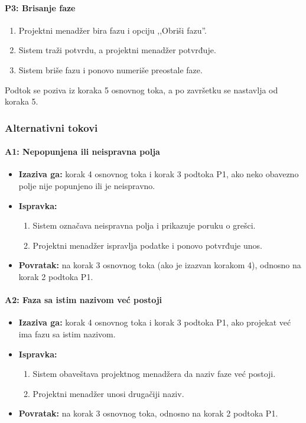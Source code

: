 \paragraph*{P3: Brisanje faze}
\begin{enumerate}
    \item Projektni menadžer bira fazu i opciju ,,Obriši fazu''.
    \item Sistem traži potvrdu, a projektni menadžer potvrđuje.
    \item Sistem briše fazu i ponovo numeriše preostale faze.
\end{enumerate}
Podtok se poziva iz koraka 5 osnovnog toka, a po završetku se nastavlja od koraka 5.

\subsubsection*{Alternativni tokovi}

\paragraph*{A1: Nepopunjena ili neispravna polja}
\begin{itemize}
    \item \textbf{Izaziva ga:} korak 4 osnovnog toka i korak 3 podtoka P1, ako neko obavezno polje nije popunjeno ili je neispravno.
    \item \textbf{Ispravka:}
    \begin{enumerate}
        \item Sistem označava neispravna polja i prikazuje poruku o grešci.
        \item Projektni menadžer ispravlja podatke i ponovo potvrđuje unos.
    \end{enumerate}
    \item \textbf{Povratak:} na korak 3 osnovnog toka (ako je izazvan korakom 4), odnosno na korak 2 podtoka P1.
\end{itemize}

\paragraph*{A2: Faza sa istim nazivom već postoji}
\begin{itemize}
    \item \textbf{Izaziva ga:} korak 4 osnovnog toka i korak 3 podtoka P1, ako projekat već ima fazu sa istim nazivom.
    \item \textbf{Ispravka:}
    \begin{enumerate}
        \item Sistem obaveštava projektnog menadžera da naziv faze već postoji.
        \item Projektni menadžer unosi drugačiji naziv.
    \end{enumerate}
    \item \textbf{Povratak:} na korak 3 osnovnog toka, odnosno na korak 2 podtoka P1.
\end{itemize}

